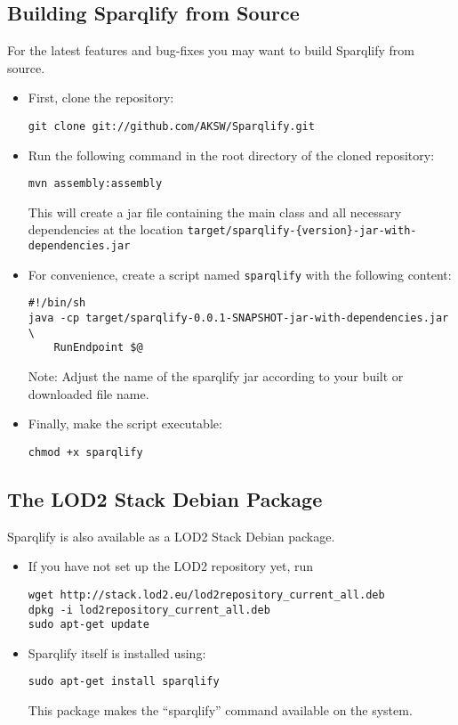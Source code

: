 \documentclass[a4paper,twoside,bibtotoc,abstracton,12pt,BCOR=15mm]{scrreprt}
\begin{document}
\subsection{Building Sparqlify from Source}
For the latest features and bug-fixes you may want to build Sparqlify from source.
\begin{itemize}
\item First, clone the repository:
\begin{lstlisting}
git clone git://github.com/AKSW/Sparqlify.git
\end{lstlisting}

\item Run the following command in the root directory of the cloned repository:
\begin{lstlisting}
mvn assembly:assembly
\end{lstlisting}
This will create a jar file containing the main class and all necessary dependencies at the location \texttt{target/sparqlify-\{version\}-jar-with-dependencies.jar}

\item For convenience, create a script named \texttt{sparqlify} with the following content:
\begin{lstlisting}
#!/bin/sh
java -cp target/sparqlify-0.0.1-SNAPSHOT-jar-with-dependencies.jar \
    RunEndpoint $@
\end{lstlisting}
Note: Adjust the name of the sparqlify jar according to your built or downloaded file name.

\item Finally, make the script executable:
\begin{lstlisting}
chmod +x sparqlify
\end{lstlisting}
\end{itemize}

\subsection{The LOD2 Stack Debian Package}
Sparqlify is also available as a LOD2 Stack Debian package.
\begin{itemize}
\item If you have not set up the LOD2 repository yet, run
\begin{lstlisting}
wget http://stack.lod2.eu/lod2repository_current_all.deb
dpkg -i lod2repository_current_all.deb
sudo apt-get update
\end{lstlisting}

\item Sparqlify itself is installed using:
\begin{lstlisting}
sudo apt-get install sparqlify
\end{lstlisting}
This package makes the ``sparqlify'' command available on the system.
\end{itemize}
 
\end{document}

